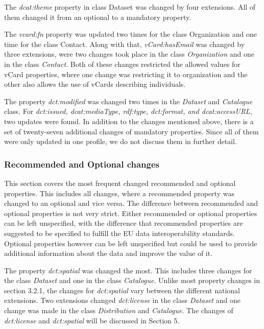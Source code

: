 \documentclass[<options>]{elsarticle}
\begin{document}
The \textit{dcat:theme} property in class Dataset was changed by four extensions. All of them changed it from an optional to a mandatory property.

The \textit{vcard:fn} property was updated two times for the class Organization and one time for the class Contact. Along with that, \textit{vCard:hasEmail} was changed by three extensions, were two changes took place in the class \textit{Organization }and one in the class \textit{Contact}. Both of these changes restricted the allowed values for vCard properties, where one change was restricting it to organization and the other also allows the use of vCards describing individuals. 

The property \textit{dct:modified} was changed two times in the \textit{Dataset} and \textit{Catalogue} class. For \textit{dct:issued, dcat:mediaType, rdf:type, dct:format, and dcat:accessURL}, two updates were found.
In addition to the changes mentioned above, there is a set of twenty-seven additional changes of mandatory properties. Since all of them were only updated in one profile, we do not discuss them in further detail.

\subsubsection{Recommended and Optional changes}
This section covers the most frequent changed recommended and optional properties. This includes all changes, where a recommended property was changed to an optional and vice versa. The difference between recommended and optional properties is not very strict. Either recommended or optional properties can be left unspecified, with the difference that recommended properties are suggested to be specified to fulfill the EU data interoperability standards. Optional properties however can be left unspecified but could be used to provide additional information about the data and improve the value of it.  

The property \textit{dct:spatial} was changed the most. This includes three changes for the class \textit{Dataset} and one in the class \textit{Catalogue}. Unlike most property changes in section 3.2.1, the changes for \textit{dct:spatial} vary between the different national extensions. Two extensions changed \textit{dct:license} in the class \textit{Dataset} and one change was made in the class \textit{Distribution} and \textit{Catalogue}. The changes of \textit{dct:license} and \textit{dct:spatial} will be discussed in Section 5. 
\end{document}
